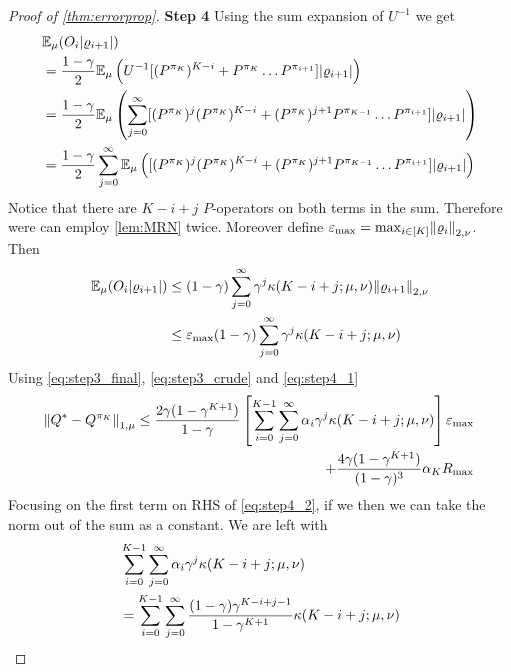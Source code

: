 \begin{proof}[Proof of \cref{thm:errorprop}]
  \textbf{Step 4}
  Using the sum expansion of $U^{-1}$ we get
  \begin{align}
    & \mathbb{E}_\mu (O_i \abs{\varrho_{i+1}})
    \\ &= \frac{1 - \gamma}{2} \mathbb{E}_\mu \left( U^{-1} [(P^{\pi_K})^{K-i} +
    P^{\pi_K} \dots P^{\pi_{i+1}}] \abs{\varrho_{i+1}} \right)
    \\ &= \frac{1 - \gamma}{2} \mathbb{E}_\mu \left( \sum_{j=0}^\infty
      [(P^{\pi_K})^j (P^{\pi_K})^{K-i}
      + (P^{\pi_K})^{j+1} P^{\pi_{K-1}} \dots P^{\pi_{i+1}}]
    \abs{\varrho_{i+1}} \right)
    \\ &= \frac{1 - \gamma}{2} \sum_{j=0}^\infty
      \mathbb{E}_\mu \left( [(P^{\pi_K})^j (P^{\pi_K})^{K-i}
      + (P^{\pi_K})^{j+1} P^{\pi_{K-1}} \dots P^{\pi_{i+1}}] 
      \abs{\varrho_{i+1}} \right)
  \end{align}
  Notice that there are $K-i+j$ $P$-operators on both terms
  in the sum. Therefore were can employ \cref{lem:MRN} twice.
  Moreover define
  $\varepsilon_{\max} = \max_{i \in [K]} \norm{\varrho_i}_{2,\nu}$.
  Then
  \begin{align}
    \mathbb{E}_\mu(O_i \abs{\varrho_{i+1}}) &\leq (1-\gamma)
    \sum_{j=0}^\infty \gamma^j \kappa(K-i+j;\mu,\nu) \norm{\varrho_{i+1}}_{2,\nu}
    \notag
    \\ &\leq \varepsilon_{\max} (1-\gamma)
    \sum_{j=0}^\infty \gamma^j \kappa(K-i+j;\mu,\nu) 
    \label{eq:step4_1}
  \end{align} 
  Using \cref{eq:step3_final}, \cref{eq:step3_crude} and \cref{eq:step4_1}
  \begin{equation}
    \begin{split}
    \norm{Q^* - Q^{\pi_K}}_{1,\mu} \leq
    \frac{2 \gamma (1- \gamma^{K+1})}{1-\gamma} 
    \left[ \sum_{i=0}^{K-1} \sum_{j=0}^\infty
    \alpha_i \gamma^j \kappa(K-i+j; \mu, \nu) \right] \varepsilon_{\max}
    \\ + \frac{4 \gamma (1-\gamma^{K+1})}{(1-\gamma)^3} \alpha_K R_{\max}
  \end{split}
  \label{eq:step4_2}
  \end{equation} 
  Focusing on the first term on RHS of \cref{eq:step4_2}, if we 
  then we can take the norm out of the sum as a constant. We are left with
  \begin{align}
    & \sum_{i=0}^{K-1} \sum_{j=0}^\infty \alpha_i \gamma^j \kappa(K-i+j;\mu,\nu)
    \notag
    \\ &= \sum_{i=0}^{K-1} \sum_{j=0}^\infty  
    \frac{(1-\gamma) \gamma^{K-i+j-1}}{1-\gamma^{K+1}} \kappa(K-i+j;\mu,\nu)
    \notag

\end{align}
\end{proof}
